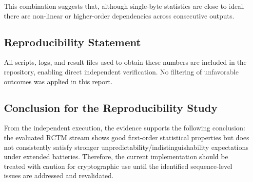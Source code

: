 This combination suggests that, although single-byte statistics are close to ideal, there are non-linear or higher-order dependencies across consecutive outputs.

\subsection{Reproducibility Statement}

All scripts, logs, and result files used to obtain these numbers are included in the repository, enabling direct independent verification. No filtering of unfavorable outcomes was applied in this report.

\subsection{Conclusion for the Reproducibility Study}

From the independent execution, the evidence supports the following conclusion: the evaluated RCTM stream shows good first-order statistical properties but does not consistently satisfy stronger unpredictability/indistinguishability expectations under extended batteries. Therefore, the current implementation should be treated with caution for cryptographic use until the identified sequence-level issues are addressed and revalidated.
